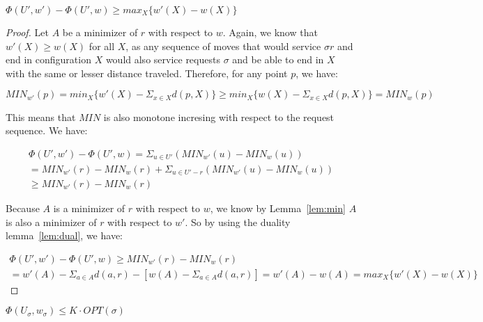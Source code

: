 \begin{lemma}
    \label{lem:ep2}
    $\Phi(U', w') - \Phi(U', w) \geq max_X \{ w'(X) - w(X)\}$
\end{lemma}

\begin{proof}
    Let $A$ be a minimizer of $r$ with respect to $w$. Again, we know that $w'(X) \geq w(X)$ for all $X$, as any sequence of moves that would service $\sigma r$ and end in configuration $X$ would also service requests $\sigma$ and be able to end in $X$ with the same or lesser distance traveled. Therefore, for any point $p$, we have: 

    \begin{equation*}
        MIN_{w'}(p) = min_{X} \{w'(X) - \Sigma_{x \in X} d(p,X) \} \geq min_{X} \{w(X) - \Sigma_{x \in X} d(p,X)  \} = MIN_w(p)
    \end{equation*}

    This means that $MIN$ is also monotone incresing with respect to the request sequence. We have:

    \begin{equation*}
        \begin{gathered}
            \Phi(U', w') - \Phi(U', w) = \Sigma_{u \in U'} (MIN_{w'}(u) - MIN_w(u)) \\
            = MIN_{w'} (r) - MIN_w(r) + \Sigma_{u \in U' - r} (MIN_{w'} (u) - MIN_w(u))\\
            \geq MIN_{w'} (r) - MIN_w(r)
        \end{gathered}
    \end{equation*}

    Because $A$ is a minimizer of $r$ with respect to $w$, we know by Lemma~\ref{lem:min} $A$ is also a minimizer of $r$ with respect to $w'$. So by using the duality lemma~\ref{lem:dual}, we have:

    \begin{equation*}
        \begin{gathered}
            \Phi(U', w') - \Phi(U', w) \geq MIN_{w'} (r) - MIN_w(r) \\
            = w'(A) - \Sigma_{a \in A} d(a,r) - [w(A) - \Sigma_{a \in A} d(a,r)]
            = w'(A) - w(A) = max_X \{ w'(X) - w(X)\}
        \end{gathered}
    \end{equation*}
\end{proof}

\begin{lemma}
    \label{lem:er1}
    $\Phi(U_\sigma, w_\sigma) \leq K \cdot  OPT(\sigma)$
\end{lemma}

